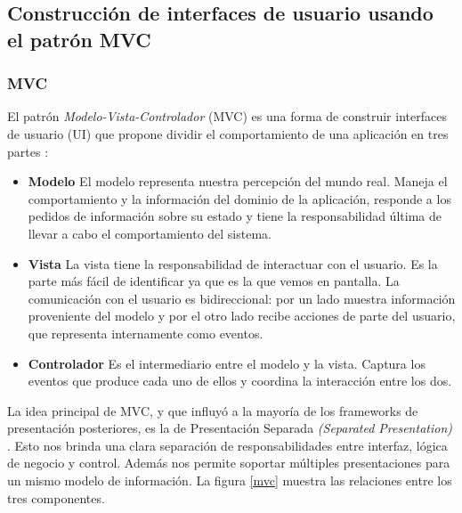\subsection{Construcción de interfaces de usuario usando el patrón MVC}
	\subsubsection{MVC}
	El patrón \emph{Modelo-Vista-Controlador} (MVC) es una forma de construir
	interfaces de usuario (UI) que propone dividir el comportamiento de una
	aplicación en tres partes \cite{reenskaug79}:
		\begin {itemize}
		\item {\bf Modelo}
			El modelo representa nuestra percepción del mundo real. 
			Maneja el comportamiento y la información del dominio de la aplicación,
			responde a los pedidos de información sobre su estado y tiene la
			responsabilidad última de llevar a cabo el comportamiento del sistema.
			
		\item {\bf Vista}
			La vista tiene la responsabilidad de interactuar con el usuario. Es la
			parte más fácil de identificar ya que es la que vemos en pantalla.
			La comunicación con el usuario es bidireccional:
			por un lado muestra información proveniente del modelo y por el otro lado
			recibe acciones de parte del usuario, que representa internamente como eventos.
			
		\item {\bf Controlador}
			Es el intermediario entre el modelo y la vista.
			Captura los eventos que produce cada uno de ellos y coordina la
			interacción entre los dos.
	\end {itemize}
	 
	La idea principal de MVC, y que influyó a la mayoría de los frameworks de
	presentación posteriores, es la de Presentación Separada \emph{(Separated
	Presentation)} \cite{burbeck87}.
	Esto nos brinda una clara separación de responsabilidades entre interfaz,
	lógica de negocio y control. Además nos permite soportar múltiples
	presentaciones para un mismo modelo de información.
	La figura \ref{mvc} muestra las relaciones entre los tres componentes.  
	
